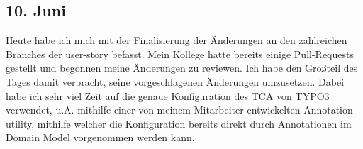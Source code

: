 \subsection{10. Juni}
Heute habe ich mich mit der Finalisierung der Änderungen an den zahlreichen Branches der user-story befasst. Mein Kollege hatte bereits einige Pull-Requests gestellt und begonnen meine Änderungen zu reviewen. Ich habe den Großteil des Tages damit verbracht, seine vorgeschlagenen Änderungen umzusetzen. Dabei habe ich sehr viel Zeit auf die genaue Konfiguration des TCA von TYPO3 verwendet, u.A. mithilfe einer von meinem Mitarbeiter entwickelten Annotation-utility, mithilfe welcher die Konfiguration bereits direkt durch Annotationen im Domain Model vorgenommen werden kann.